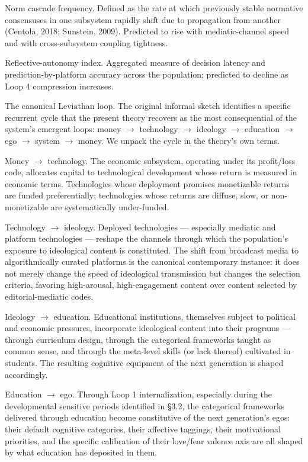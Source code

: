 \documentclass[12pt,a4paper]{article}
\begin{document}
Norm cascade frequency. Defined as the rate at which previously stable normative consensuses in one subsystem rapidly shift due to propagation from another (Centola, 2018; Sunstein, 2009). Predicted to rise with mediatic-channel speed and with cross-subsystem coupling tightness.

Reflective-autonomy index. Aggregated measure of decision latency and prediction-by-platform accuracy across the population; predicted to decline as Loop 4 compression increases.


The canonical Leviathan loop. The original informal sketch identifies a specific recurrent cycle that the present theory recovers as the most consequential of the system's emergent loops: money $\rightarrow$ technology $\rightarrow$ ideology $\rightarrow$ education $\rightarrow$ ego $\rightarrow$ system $\rightarrow$ money. We unpack the cycle in the theory's own terms.


Money $\rightarrow$ technology. The economic subsystem, operating under its profit/loss code, allocates capital to technological development whose return is measured in economic terms. Technologies whose deployment promises monetizable returns are funded preferentially; technologies whose returns are diffuse, slow, or non-monetizable are systematically under-funded.

Technology $\rightarrow$ ideology. Deployed technologies --- especially mediatic and platform technologies --- reshape the channels through which the population's exposure to ideological content is constituted. The shift from broadcast media to algorithmically curated platforms is the canonical contemporary instance: it does not merely change the speed of ideological transmission but changes the selection criteria, favoring high-arousal, high-engagement content over content selected by editorial-mediatic codes.

Ideology $\rightarrow$ education. Educational institutions, themselves subject to political and economic pressures, incorporate ideological content into their programs --- through curriculum design, through the categorical frameworks taught as common sense, and through the meta-level skills (or lack thereof) cultivated in students. The resulting cognitive equipment of the next generation is shaped accordingly.

Education $\rightarrow$ ego. Through Loop 1 internalization, especially during the developmental sensitive periods identified in §3.2, the categorical frameworks delivered through education become constitutive of the next generation's egos: their default cognitive categories, their affective taggings, their motivational priorities, and the specific calibration of their love/fear valence axis are all shaped by what education has deposited in them.
\end{document}
